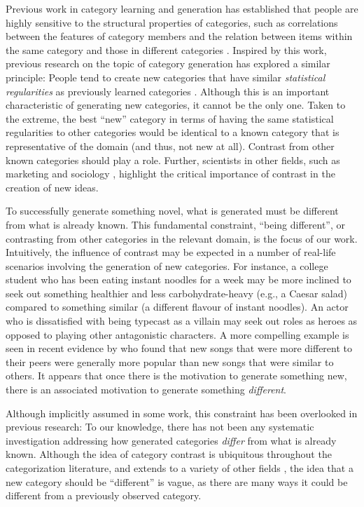 \documentclass[12pt]{article}
\begin{document}
\begin{flushleft}
Previous work in category learning and generation has established that people
are highly sensitive to the structural properties of categories, such as
correlations between the features of category members and the relation between
items within the same category and those in different categories
\citep{roschmervis1975,regier2007,shepard1961learning,smith1995creative}.
Inspired by this work, previous research on the topic of category generation has
explored a similar principle: People tend to create new categories that have
similar {\em statistical regularities} as previously learned categories
\citep{jern2013probabilistic,ward1994structured}. Although this is an important
characteristic of generating new categories, it cannot be the only one. Taken to
the extreme, the best ``new'' category in terms of having the same statistical
regularities to other categories would be identical to a known category that is
representative of the domain (and thus, not new at all). Contrast from other
known categories should play a role. Further, scientists in other fields, such
as marketing \citep{berger16} and sociology \citep{rogers03}, highlight the
critical importance of contrast in the creation of new ideas.

To successfully generate something novel, what is generated must be different
from what is already known. This fundamental constraint, ``being different'', or
contrasting from other categories in the relevant domain, is the focus of our
work. Intuitively, the influence of contrast may be expected in a number of
real-life scenarios involving the generation of new categories. For instance, a
college student who has been eating instant noodles for a week may be more
inclined to seek out something healthier and less carbohydrate-heavy (e.g., a
Caesar salad) compared to something similar (a different flavour of instant
noodles). An actor who is dissatisfied with being typecast as a villain may seek
out roles as heroes as opposed to playing other antagonistic characters. A more
compelling example is seen in recent evidence by \cite{askin2017} who found that
new songs that were more different to their peers were generally more popular
than new songs that were similar to others. It appears that once there is the
motivation to generate something new, there is an associated motivation to
generate something \emph{different}. 

Although implicitly assumed in some work, this constraint has been
overlooked in previous research: To our knowledge, there has not been any
systematic investigation addressing how generated categories {\em differ} from
what is already known. Although the idea of category contrast is ubiquitous
throughout the categorization literature, and extends to a variety of other
fields \citep[e.g., color;][]{regier2007}, the idea that a new category should
be ``different'' is vague, as there are many ways it could be different from a
previously observed category.


\end{flushleft}
\end{document}
